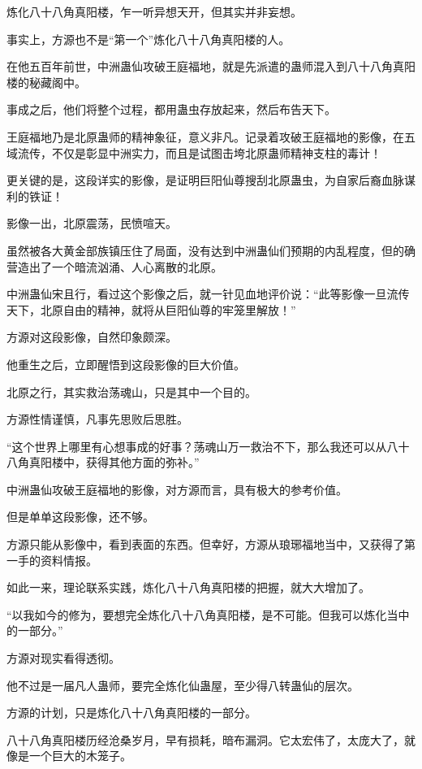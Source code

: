 
\begin{this_body}

炼化八十八角真阳楼，乍一听异想天开，但其实并非妄想。

事实上，方源也不是“第一个”炼化八十八角真阳楼的人。

在他五百年前世，中洲蛊仙攻破王庭福地，就是先派遣的蛊师混入到八十八角真阳楼的秘藏阁中。

事成之后，他们将整个过程，都用蛊虫存放起来，然后布告天下。

王庭福地乃是北原蛊师的精神象征，意义非凡。记录着攻破王庭福地的影像，在五域流传，不仅是彰显中洲实力，而且是试图击垮北原蛊师精神支柱的毒计！

更关键的是，这段详实的影像，是证明巨阳仙尊搜刮北原蛊虫，为自家后裔血脉谋利的铁证！

影像一出，北原震荡，民愤喧天。

虽然被各大黄金部族镇压住了局面，没有达到中洲蛊仙们预期的内乱程度，但的确营造出了一个暗流汹涌、人心离散的北原。

中洲蛊仙宋且行，看过这个影像之后，就一针见血地评价说：“此等影像一旦流传天下，北原自由的精神，就将从巨阳仙尊的牢笼里解放！”

方源对这段影像，自然印象颇深。

他重生之后，立即醒悟到这段影像的巨大价值。

北原之行，其实救治荡魂山，只是其中一个目的。

方源性情谨慎，凡事先思败后思胜。

“这个世界上哪里有心想事成的好事？荡魂山万一救治不下，那么我还可以从八十八角真阳楼中，获得其他方面的弥补。”

中洲蛊仙攻破王庭福地的影像，对方源而言，具有极大的参考价值。

但是单单这段影像，还不够。

方源只能从影像中，看到表面的东西。但幸好，方源从琅琊福地当中，又获得了第一手的资料情报。

如此一来，理论联系实践，炼化八十八角真阳楼的把握，就大大增加了。

“以我如今的修为，要想完全炼化八十八角真阳楼，是不可能。但我可以炼化当中的一部分。”

方源对现实看得透彻。

他不过是一届凡人蛊师，要完全炼化仙蛊屋，至少得八转蛊仙的层次。

方源的计划，只是炼化八十八角真阳楼的一部分。

八十八角真阳楼历经沧桑岁月，早有损耗，暗布漏洞。它太宏伟了，太庞大了，就像是一个巨大的木笼子。


\end{this_body}
